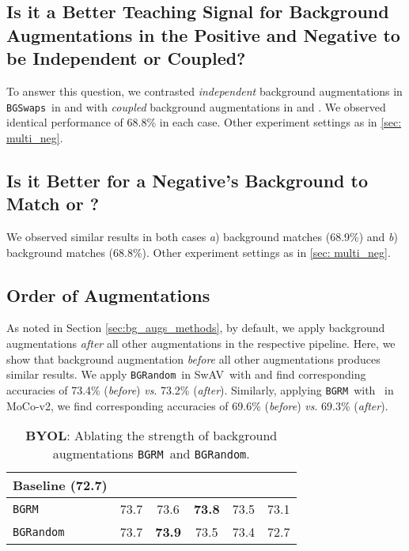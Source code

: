 \documentclass[twoside,11pt]{article}
\newcommand{\bgrm}{\texttt{BG\textunderscore RM}}
\newcommand{\bgswaps}{\texttt{BG\textunderscore Swaps}}
\newcommand{\bgrand}{\texttt{BG\textunderscore Random}}
\newcommand{\moco}{MoCo-v2}
\newcommand{\swav}{SwAV}
\begin{document}
\subsection{Is it a Better Teaching Signal for Background Augmentations in the Positive and Negative to be Independent or Coupled? }
To answer this question, we contrasted \textit{independent} background augmentations in \bgswaps~in  and  with \textit{coupled }background augmentations in  and . We observed identical performance of 68.8\% in each case. Other experiment settings as in \ref{sec: multi_neg}.

\subsection{Is it Better for a Negative's Background to Match \texorpdfstring{}{q} or \texorpdfstring{}{k+}?}

We observed similar results in both cases \textit{a}) background matches  (68.9\%) and \textit{b}) background matches  (68.8\%). Other experiment settings as in \ref{sec: multi_neg}.

\subsection{Order of Augmentations}
\label{app:aug_order}
As noted in Section \ref{sec:bg_augs_methods}, by default, we apply background augmentations \textit{after} all other augmentations in the respective pipeline. Here, we show that background augmentation \textit{before} all other augmentations produces similar results. We apply \bgrand~in \swav~with  and find corresponding accuracies of 73.4\% (\textit{before}) \textit{vs}. 73.2\% (\textit{after}). Similarly, applying \bgrm~with ~in \moco, we find corresponding accuracies of 69.6\%  (\textit{before}) \textit{vs}. 69.3\% (\textit{after}).


\begin{table}
    \centering
    \begin{tabular}{lccccc}\toprule
         Baseline (72.7) &  &  &  &   &  \\\midrule
         \bgrm &  73.7 & 73.6 & \textbf{73.8} & 73.5 & 73.1 \\ 
         \bgrand & 73.7 & \textbf{73.9} & 73.5 & 73.4 & 72.7 \\ \bottomrule
    \end{tabular}
    \caption{\textbf{BYOL}: Ablating the strength of background augmentations \bgrm~and \bgrand.}
    \label{tab: byol_aug_strength}
\end{table}
\end{document}
